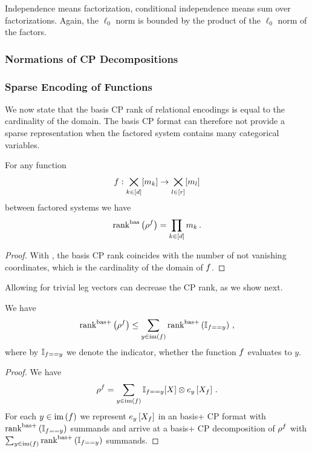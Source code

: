 \begin{example}
	Independence means factorization, conditional independence means sum over factorizations.
	Again, the $\ell_0$ norm is bounded by the product of the $\ell_0$ norm of the factors.
\end{example}


\subsubsection{Normations of CP Decompositions}


\subsubsection{Sparse Encoding of Functions}


We now state that the basis CP rank of relational encodings is equal to the cardinality of the domain.
The basis CP format can therefore not provide a sparse representation when the factored system contains many categorical variables.

\begin{theorem}\label{the:rencodingBasCP}
	For any function
		\[ f : \bigtimes_{k\in[d]}[m_{k}] \rightarrow  \bigtimes_{l\in[r]}[m_{l}] \]
	between factored systems we have
		\[ \mathrm{rank}^{\mathrm{bas}}\left(\rho^{f}\right) =  \prod_{k\in[d]}m_{k} \, . \]
\end{theorem}
\begin{proof}
	With , the basis CP rank coincides with the number of not vanishing coordinates, which is the cardinality of the domain of $f$.
\end{proof}

Allowing for trivial leg vectors can decrease the CP rank, as we show next.

\begin{theorem}
	We have
		\[ \mathrm{rank}^{\mathrm{bas+}}\left(\rho^{f}\right) \leq  \sum_{y \in \mathrm{im}\left(f\right)} \mathrm{rank}^{\mathrm{bas+}}\left(\mathbb{I}_{f == y} \right) \, , \]
	where by $\mathbb{I}_{f == y} $ we denote the indicator, whether the function $f$ evaluates to $y$.
\end{theorem}
\begin{proof}
	We have
		\[ \rho^{f} = \sum_{y \in \mathrm{im}\left(f\right)} \mathbb{I}_{f == y}[X]  \otimes e_{y}\left[X_{f}\right] \, . \]
	For each $y \in \mathrm{im}\left(f\right)$ we represent $e_{y}\left[X_{f}\right]$ in an basis+ CP format with $\mathrm{rank}^{\mathrm{bas+}}\left(\mathbb{I}_{f == y} \right) $ summands and arrive at a basis+ CP decomposition of $\rho^{f}$ with $\sum_{y \in \mathrm{im}\left(f\right)} \mathrm{rank}^{\mathrm{bas+}}\left(\mathbb{I}_{f == y} \right) $ summands.
\end{proof}

